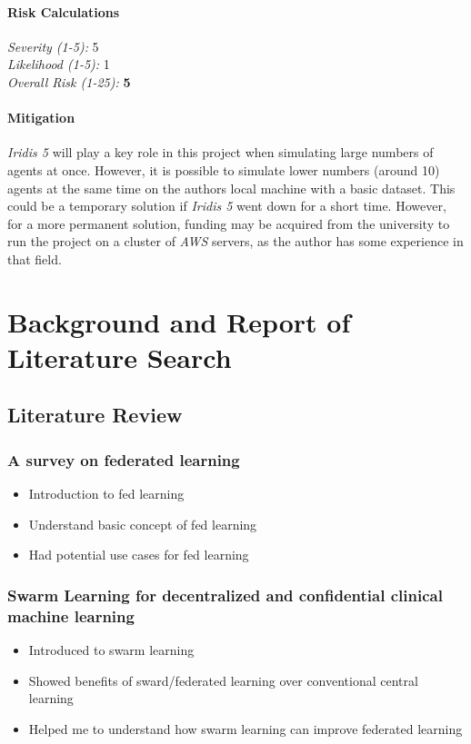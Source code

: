 \documentclass[12pt,a4paper,titlepage]{report}
\begin{document}
	\subsubsection{Risk Calculations}
	\emph{Severity (1-5):} 5 \\
	\emph{Likelihood (1-5):} 1 \\
	\emph{Overall Risk (1-25):} \textbf{5}
	\subsubsection{Mitigation}
	\emph{Iridis 5} will play a key role in this project when simulating large numbers of agents at once. However, it is possible to simulate lower numbers (around 10) agents at the same time on the authors local machine with a basic dataset. This could be a temporary solution if \emph{Iridis 5} went down for a short time. However, for a more permanent solution, funding may be acquired from the university to run the project on a cluster of \emph{AWS} servers, as the author has some experience in that field. 
	
	\chapter{Background and Report of Literature Search}
	\section{Literature Review}
	\subsection{A survey on federated learning \cite{survey_on_fed_learning}}
	\begin{itemize}
		\item Introduction to fed learning
		\item Understand basic concept of fed learning
		\item Had potential use cases for fed learning
	\end{itemize}

	\subsection{Swarm Learning for decentralized and confidential clinical machine learning \cite{swarm_learning}}
	\begin{itemize}
		\item Introduced to swarm learning
		\item Showed benefits of sward/federated learning over conventional central learning
		\item Helped me to understand how swarm learning can improve federated learning
	\end{itemize}
\end{document}

